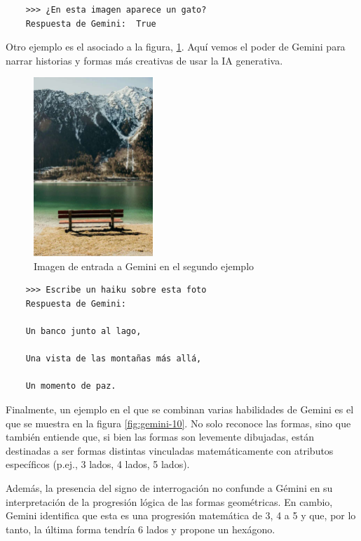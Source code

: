 \begin{verbatim}
	>>> ¿En esta imagen aparece un gato?
	Respuesta de Gemini:  True
\end{verbatim}

Otro ejemplo es el asociado a la figura, \ref{fig:gemini-9}. Aquí vemos el poder de Gemini para narrar historias y formas más creativas de usar la IA generativa. 

\begin{figure}[h]
	\centering
	\includegraphics[width=0.4\textwidth]{Imagenes/ImagenesGemini/gemini-9}
	\caption{Imagen de entrada a Gemini en el segundo ejemplo}
	\label{fig:gemini-9}
\end{figure}

\begin{verbatim}
	>>> Escribe un haiku sobre esta foto
	Respuesta de Gemini: 
	 
	Un banco junto al lago,
	
	Una vista de las montañas más allá,
	
	Un momento de paz.
\end{verbatim}
Finalmente, un ejemplo en el que se combinan varias habilidades de Gemini es el que se muestra en la figura \ref{fig:gemini-10}. No solo reconoce las formas, sino que también entiende que, si bien las formas son levemente dibujadas, están destinadas a ser formas distintas vinculadas matemáticamente con atributos específicos (p.ej., 3 lados, 4 lados, 5 lados).

Además, la presencia del signo de interrogación no confunde a Gémini en su interpretación de la progresión lógica de las formas geométricas. En cambio, Gemini identifica que esta es una progresión matemática de 3, 4 a 5 y que, por lo tanto, la última forma tendría 6 lados y propone un hexágono.

